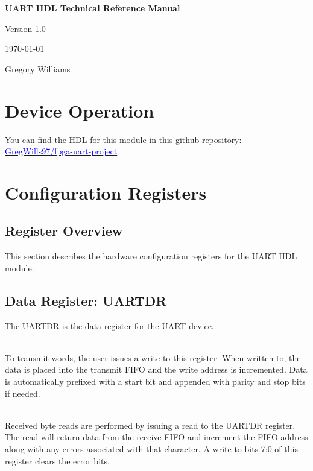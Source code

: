 \documentclass[a4paper,12pt]{article}
\begin{document}
\begin{titlepage}
    \centering
    \vspace*{2cm}
    {\Huge \bfseries UART HDL Technical Reference Manual \par}
    \vspace{2cm}
    {\Large Version 1.0 \par}
    \vspace{1cm}
    {\large \today \par}
    \vfill
    {\large Gregory Williams}
\end{titlepage}

\tableofcontents
\newpage

\section{Device Operation}
You can find the HDL for this module in this github repository:
\href{https://github.com/GregWills97/fpga-uart-project}
{\textcolor{blue}{GregWills97/fpga-uart-project}} \faGithub

\section{Configuration Registers}
\subsection{Register Overview}
This section describes the hardware configuration registers for the UART HDL module.

\subsection{Data Register: UARTDR}
The UARTDR is the data register for the UART device.

\noindent\\
To transmit words, the user issues a write to this register. When written to, the data is placed
into the transmit FIFO and the write address is incremented. Data is automatically prefixed with a
start bit and appended with parity and stop bits if needed.

\noindent\\
Received byte reads are performed by issuing a read to the UARTDR register. The read will return
data from the receive FIFO and increment the FIFO address along with any errors associated with that
character. A write to bits 7:0 of this register clears the error bits.
\end{document}
